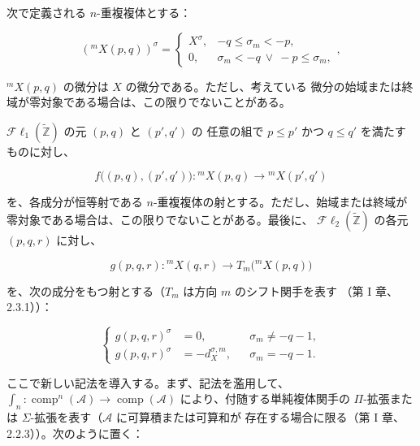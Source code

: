 \clearpage
{}%
\begingroup\small\setlength{\parskip}{0pt}\setlength{\emergencystretch}{1.5em}
\setlength{\abovedisplayskip}{4pt plus 2pt minus 2pt}%
\setlength{\belowdisplayskip}{4pt plus 2pt minus 2pt}%

\noindent 次で定義される $n$-重複複体とする：

\begin{equation}
({}^{m}\!X(p,q))^\sigma=
\begin{cases}
X^\sigma,&-q\leq\sigma_m<-p,\\
0,&\sigma_m<-q\ \lor\ -p\leq\sigma_m,
\end{cases},
\tag{4.1.6.1}
\end{equation}

\noindent ${}^{m}\!X(p,q)$ の微分は $X$ の微分である。ただし、考えている
微分の始域または終域が零対象である場合は、この限りでないことがある。

$\mathcal{F}\ell_1(\widetilde{\mathbb Z})$ の元 $(p,q)$ と $(p',q')$ の
任意の組で $p\leq p'$ かつ $q\leq q'$ を満たすものに対し、

\begin{equation}
f\bigl((p,q),(p',q')\bigr)\colon
{}^{m}\!X(p,q)\longrightarrow{}^{m}\!X(p',q')
\tag{4.1.6.2}
\end{equation}

を、各成分が恒等射である $n$-重複複体の射とする。ただし、始域または終域が
零対象である場合は、この限りでないことがある。最後に、
$\mathcal{F}\ell_2(\widetilde{\mathbb Z})$ の各元 $(p,q,r)$ に対し、

\begin{equation}
g(p,q,r)\colon{}^{m}\!X(q,r)
\longrightarrow T_m\bigl({}^{m}\!X(p,q)\bigr)
\tag{4.1.6.3}
\end{equation}

を、次の成分をもつ射とする（$T_m$ は方向 $m$ のシフト関手を表す
（第 I 章、2.3.1））：

\begin{equation}
\left\{
\begin{aligned}
g(p,q,r)^\sigma&=0,
  &&\sigma_m\neq-q-1,\\
g(p,q,r)^\sigma&=-d_X^{\sigma,m},
  &&\sigma_m=-q-1.
\end{aligned}
\right.
\tag{4.1.6.4}
\end{equation}

ここで新しい記法を導入する。まず、記法を濫用して、
$\int_n\colon\operatorname{comp}^n(\mathcal A)\longrightarrow
\operatorname{comp}(\mathcal A)$ により、付随する単純複体関手の
$\Pi$-拡張または $\Sigma$-拡張を表す（$\mathcal A$ に可算積または可算和が
存在する場合に限る（第 I 章、2.2.3））。次のように置く：


